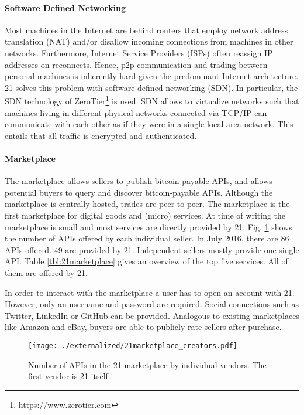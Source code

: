 \paragraph{Software Defined Networking}

Most machines in the Internet are behind routers that employ network address translation (NAT) and/or disallow incoming connections from machines in other networks. Furthermore, Internet Service Providers (ISPs) often reassign IP addresses on reconnects. Hence, p2p communication and trading between personal machines is inherently hard given the predominant Internet architecture. 21 solves this problem with software defined networking (SDN). In particular, the SDN technology of ZeroTier\footnote{https://www.zerotier.com} is used. SDN allows to virtualize networks such that machines living in different physical networks connected via TCP/IP can communicate with each other as if they were in a single local area network. This entails that all traffic is encrypted and authenticated. 

\paragraph{Marketplace}

The marketplace allows sellers to publish bitcoin-payable APIs, and allows potential buyers to query and discover bitcoin-payable APIs. Although the marketplace is centrally hosted, trades are peer-to-peer. The marketplace is the first marketplace for digital goods and (micro) services. At time of writing the marketplace is small and most services are directly provided by 21. Fig. \ref{fig:21marketplace} shows the number of APIs offered by each individual seller. In July 2016, there are 86 APIs offered. 49 are provided by 21. Independent sellers mostly provide one single API. Table \ref{tbl:21marketplace} gives an overview of the top five services. All of them are offered by 21. 

In order to interact with the marketplace a user has to open an account with 21. However, only an username and password are required. Social connections such as Twitter, LinkedIn or GitHub can be provided. Analogous to existing marketplaces like Amazon and eBay, buyers are able to publicly rate sellers after purchase.  

\begin{figure}
\centering
\texttt{[image: ./externalized/21marketplace\_creators.pdf]}
\caption{Number of APIs in the 21 marketplace by individual vendors. The first vendor is 21 itself.}
\label{fig:21marketplace}
\end{figure}


